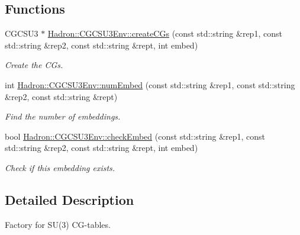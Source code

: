 \subsection*{Functions}
\begin{DoxyCompactItemize}
\item 
C\+G\+C\+S\+U3 $\ast$ \mbox{\hyperlink{namespaceHadron_1_1CGCSU3Env_aa351bf5350216c70336911a96182d035}{Hadron\+::\+C\+G\+C\+S\+U3\+Env\+::create\+C\+Gs}} (const std\+::string \&rep1, const std\+::string \&rep2, const std\+::string \&rept, int embed)
\begin{DoxyCompactList}\small\item\em Create the C\+Gs. \end{DoxyCompactList}\item 
int \mbox{\hyperlink{namespaceHadron_1_1CGCSU3Env_acc35e8f63cd5a1ffe14a963df3f2c1fd}{Hadron\+::\+C\+G\+C\+S\+U3\+Env\+::num\+Embed}} (const std\+::string \&rep1, const std\+::string \&rep2, const std\+::string \&rept)
\begin{DoxyCompactList}\small\item\em Find the number of embeddings. \end{DoxyCompactList}\item 
bool \mbox{\hyperlink{namespaceHadron_1_1CGCSU3Env_a27b5d0906a9a8d201a8479db853e5ca5}{Hadron\+::\+C\+G\+C\+S\+U3\+Env\+::check\+Embed}} (const std\+::string \&rep1, const std\+::string \&rep2, const std\+::string \&rept, int embed)
\begin{DoxyCompactList}\small\item\em Check if this embedding exists. \end{DoxyCompactList}\end{DoxyCompactItemize}


\subsection{Detailed Description}
Factory for S\+U(3) C\+G-\/tables. 

